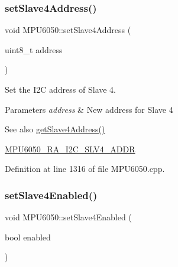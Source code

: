 \subsubsection{\texorpdfstring{setSlave4Address()}{setSlave4Address()}}
{\footnotesize\ttfamily void M\+P\+U6050\+::set\+Slave4\+Address (\begin{DoxyParamCaption}\item[{uint8\+\_\+t}]{address }\end{DoxyParamCaption})}

Set the I2C address of Slave 4. 
\begin{DoxyParams}{Parameters}
{\em address} & New address for Slave 4 \\
\hline
\end{DoxyParams}
\begin{DoxySeeAlso}{See also}
\mbox{\hyperlink{classMPU6050_a4278dec5fec25be9a6f45b51a3373ad2}{get\+Slave4\+Address()}} 

\mbox{\hyperlink{MPU6050_8h_a3a3a4854870a5f354e50fbc4eae196c0}{M\+P\+U6050\+\_\+\+R\+A\+\_\+\+I2\+C\+\_\+\+S\+L\+V4\+\_\+\+A\+D\+DR}} 
\end{DoxySeeAlso}


Definition at line 1316 of file M\+P\+U6050.\+cpp.


\begin{DoxyCode}{0}

\end{DoxyCode}
\mbox{\label{classMPU6050_a04be2a8c3af6ef174f97769b9b5164a9}} 
\subsubsection{\texorpdfstring{setSlave4Enabled()}{setSlave4Enabled()}}
{\footnotesize\ttfamily void M\+P\+U6050\+::set\+Slave4\+Enabled (\begin{DoxyParamCaption}\item[{bool}]{enabled }\end{DoxyParamCaption})}

